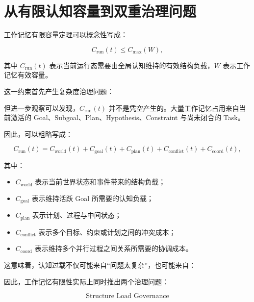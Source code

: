 \section{从有限认知容量到双重治理问题}

工作记忆有限容量定理可以概念性写成：

\[
C_{\mathrm{run}}(t)
\leq
C_{\max}(W),
\]

其中 $C_{\mathrm{run}}(t)$ 表示当前运行态需要由全局认知维持的有效结构负载，$W$ 表示工作记忆有效容量。

这一约束首先产生复杂度治理问题：

\begin{statementbox}
\centering
{}
\end{statementbox}

但进一步观察可以发现，$C_{\mathrm{run}}(t)$ 并不是凭空产生的。大量工作记忆占用来自当前激活的 Goal、Subgoal、Plan、Hypothesis、Constraint 与尚未闭合的 Task。

因此，可以粗略写成：

\[
C_{\mathrm{run}}(t)
=
C_{\mathrm{world}}(t)
+
C_{\mathrm{goal}}(t)
+
C_{\mathrm{plan}}(t)
+
C_{\mathrm{conflict}}(t)
+
C_{\mathrm{coord}}(t),
\]

其中：

\begin{itemize}
    \item $C_{\mathrm{world}}$ 表示当前世界状态和事件带来的结构负载；
    \item $C_{\mathrm{goal}}$ 表示维持活跃 Goal 所需要的认知负载；
    \item $C_{\mathrm{plan}}$ 表示计划、过程与中间状态；
    \item $C_{\mathrm{conflict}}$ 表示多个目标、约束或计划之间的冲突成本；
    \item $C_{\mathrm{coord}}$ 表示维持多个并行过程之间关系所需要的协调成本。
\end{itemize}

这意味着，认知过载不仅可能来自``问题太复杂''，也可能来自：

\begin{statementbox}
\centering
{}
\end{statementbox}

因此，工作记忆有限性实际上同时推出两个治理问题：

\[
\boxed{
\text{Structure Load Governance}
}
\]


